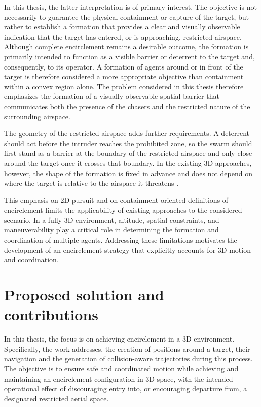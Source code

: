 In this thesis, the latter interpretation is of primary interest. The objective is not necessarily to guarantee the physical containment or capture of the target, but rather to establish a formation that provides a clear and visually observable indication that the target has entered, or is approaching, restricted airspace. Although complete encirclement remains a desirable outcome, the formation is primarily intended to function as a visible barrier or deterrent to the target and, consequently, to its operator. A formation of agents around or in front of the target is therefore considered a more appropriate objective than containment within a convex region alone. The problem considered in this thesis therefore emphasizes the formation of a visually observable spatial barrier that communicates both the presence of the chasers and the restricted nature of the surrounding airspace. 

The geometry of the restricted airspace adds further requirements. A deterrent should act before the intruder reaches the prohibited zone, so the swarm should first stand as a barrier at the boundary of the restricted airspace and only close around the target once it crosses that boundary. In the existing \gls{3D} approaches, however, the shape of the formation is fixed in advance and does not depend on where the target is relative to the airspace it threatens \cite{franchi2016,huang2025,bo2023}.

This emphasis on \gls{2D} pursuit and on containment-oriented definitions of encirclement limits the applicability of existing approaches to the considered scenario. In a fully \gls{3D} environment, altitude, spatial constraints, and maneuverability play a critical role in determining the formation and coordination of multiple agents. Addressing these limitations motivates the development of an encirclement strategy that explicitly accounts for \gls{3D} motion and coordination.

\section{Proposed solution and contributions} \label{sec.1:Proposed solution}

In this thesis, the focus is on achieving encirclement in a \gls{3D} environment. Specifically, the work addresses, the creation of positions around a target, their navigation and the generation of collision-aware trajectories during this process. The objective is to ensure safe and coordinated motion while achieving and maintaining an encirclement configuration in \gls{3D} space, with the intended operational effect of discouraging entry into, or encouraging departure from, a designated restricted aerial space.

